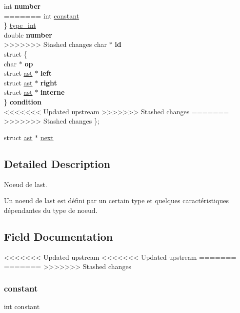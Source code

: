 \begin{DoxyCompactItemize}
\begin{tabbing}
\>int {\bfseries number}\\
=======
\>\>int \hyperlink{structast_ac347bb44c6dc857729453831c5714f84}{constant}\\
\>\} \hyperlink{structast_a48c1fea64ccd73c68d3901c23d65f9f5}{type\_int}\\
\>double {\bfseries number}\\
>>>>>>> Stashed changes
\>char $\ast$ {\bfseries id}\\
\>struct \{\\
\>\>char $\ast$ {\bfseries op}\\
\>\>struct \hyperlink{structast}{ast} $\ast$ {\bfseries left}\\
\>\>struct \hyperlink{structast}{ast} $\ast$ {\bfseries right}\\
\>\>struct \hyperlink{structast}{ast} $\ast$ {\bfseries interne}\\
\>\} {\bfseries condition}\\
<<<<<<< Updated upstream
>>>>>>> Stashed changes
=======
>>>>>>> Stashed changes
\}; \\

\end{tabbing}\item 
struct \hyperlink{structast}{ast} $\ast$ \hyperlink{structast_ae48f04f7acec87ecf7f0bc953cb56bf4}{next}
\end{DoxyCompactItemize}


\subsection{Detailed Description}
Noeud de l\textquotesingle{}ast. 

Un noeud de l\textquotesingle{}ast est défini par un certain type et quelques caractéristiques dépendantes du type de noeud. 

\subsection{Field Documentation}
<<<<<<< Updated upstream
<<<<<<< Updated upstream
\mbox{\label{structast_aecb3b0d045ada529257a2fbf8f829599}} 
=======
=======
>>>>>>> Stashed changes
\mbox{\label{structast_ac347bb44c6dc857729453831c5714f84}} 
\subsubsection{\texorpdfstring{constant}{constant}}
{\footnotesize\ttfamily int constant}


